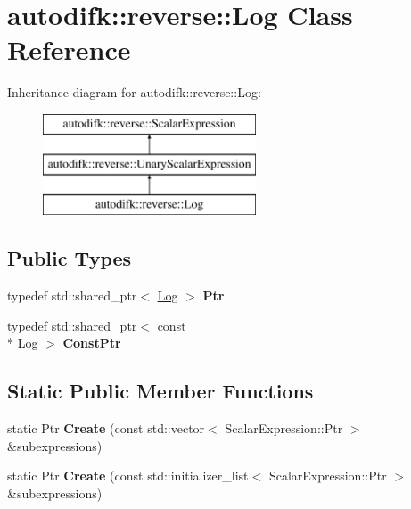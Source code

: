 \hypertarget{classautodifk_1_1reverse_1_1_log}{\section{autodifk\-:\-:reverse\-:\-:Log Class Reference}
\label{classautodifk_1_1reverse_1_1_log}
}
Inheritance diagram for autodifk\-:\-:reverse\-:\-:Log\-:\begin{figure}[H]
\begin{center}
\leavevmode
\includegraphics[height=3.000000cm]{classautodifk_1_1reverse_1_1_log}
\end{center}
\end{figure}
\subsection*{Public Types}
\begin{DoxyCompactItemize}
\item 
\hypertarget{classautodifk_1_1reverse_1_1_log_a9c1953ae1f3d91f14385aaa62cbe07c7}{typedef std\-::shared\-\_\-ptr$<$ \hyperlink{classautodifk_1_1reverse_1_1_log}{Log} $>$ {\bfseries Ptr}}\label{classautodifk_1_1reverse_1_1_log_a9c1953ae1f3d91f14385aaa62cbe07c7}

\item 
\hypertarget{classautodifk_1_1reverse_1_1_log_a7b424471b065614d4627584a50437a7b}{typedef std\-::shared\-\_\-ptr$<$ const \\*
\hyperlink{classautodifk_1_1reverse_1_1_log}{Log} $>$ {\bfseries Const\-Ptr}}\label{classautodifk_1_1reverse_1_1_log_a7b424471b065614d4627584a50437a7b}

\end{DoxyCompactItemize}
\subsection*{Static Public Member Functions}
\begin{DoxyCompactItemize}
\item 
\hypertarget{classautodifk_1_1reverse_1_1_log_af68dc69020ab0859dc9d87fe22ff52f0}{static Ptr {\bfseries Create} (const std\-::vector$<$ Scalar\-Expression\-::\-Ptr $>$ \&subexpressions)}\label{classautodifk_1_1reverse_1_1_log_af68dc69020ab0859dc9d87fe22ff52f0}

\item 
\hypertarget{classautodifk_1_1reverse_1_1_log_ad0ceeaf7e6152a55d0202419fb571802}{static Ptr {\bfseries Create} (const std\-::initializer\-\_\-list$<$ Scalar\-Expression\-::\-Ptr $>$ \&subexpressions)}\label{classautodifk_1_1reverse_1_1_log_ad0ceeaf7e6152a55d0202419fb571802}

\end{DoxyCompactItemize}
